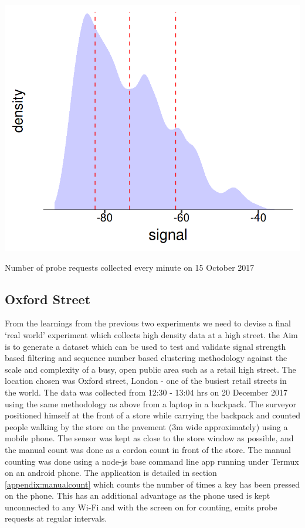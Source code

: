 \begin{marginfigure}
\includegraphics[trim={5 5 5 5},clip]{images/ucl-signal-dist.png}
  \caption{Number of probe requests collected every minute on 15 October 2017}
  \label{figure:collection:ucl:signal}
\end{marginfigure}
\marginnote{\textit{} }


\subsection{Oxford Street}
From the learnings from the previous two experiments we need to devise a final `real world' experiment which collects high density data at a high street.
the Aim is to generate a dataset which can be used to test and validate signal strength based filtering and sequence number based clustering methodology against the scale and complexity of a busy, open public area such as a retail high street.
The location chosen was Oxford street, London - one of the busiest retail streets in the world.
The data was collected from 12:30 - 13:04 hrs on 20 December 2017 using the same methodology as above from a laptop in a backpack.
The surveyor positioned himself at the front of a store while carrying the backpack and counted people walking by the store on the pavement (3m wide approximately) using a mobile phone.
The sensor was kept as close to the store window as possible, and the manual count was done as a cordon count in front of the store.
The manual counting was done using a node-js base command line app running under Termux on an android phone.
The application is detailed in section \ref{appendix:manualcount} which counts the number of times a key has been pressed on the phone.
This has an additional advantage as the phone used is kept unconnected to any Wi-Fi and with the screen on for counting, emits probe requests at regular intervals.

